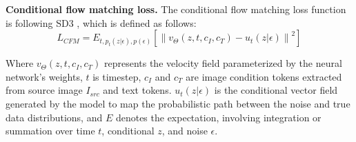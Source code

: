 


\noindent \textbf{Conditional flow matching loss.} The conditional flow matching loss function is following SD3 \cite{sd3}, which is defined as follows:
\begin{equation}
L_{CFM} = E_{t, p_t(z|\epsilon), p(\epsilon)} \left[ \left\| v_\Theta(z, t, c_I,c_T) - u_t(z|\epsilon) \right\|^2 \right]
\end{equation}

Where $ v_\Theta(z, t, c_I,c_T)$ represents the velocity field parameterized by the neural network's weights, $t$ is timestep, $c_I$ and $c_T$ are image condition tokens extracted from source image $I_{src}$ and text tokens. $u_t(z|\epsilon)$ is the conditional vector field generated by the model to map the probabilistic path between the noise and true data distributions, and $E$ denotes the expectation, involving integration or summation over time $t$, conditional $z$, and noise $ \epsilon $. 



